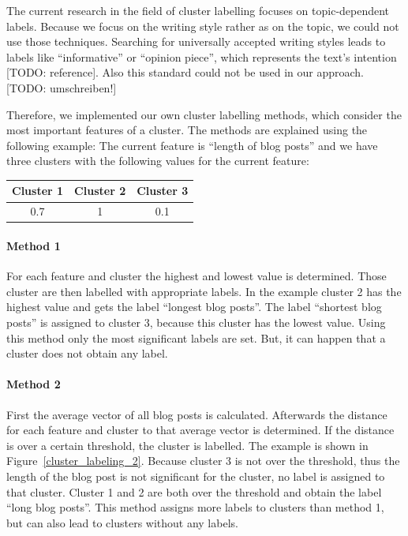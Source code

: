 The current research in the field of cluster labelling focuses on topic-dependent labels.
Because we focus on the writing style rather as on the topic, we could not use those techniques.
Searching for universally accepted writing styles leads to labels like ``informative'' or ``opinion piece'', which represents the text's intention [TODO: reference].
Also this standard could not be used in our approach.
[TODO: umschreiben!]

Therefore, we implemented our own cluster labelling methods, which consider the most important features of a cluster.
The methods are explained using the following example:
The current feature is ``length of blog posts'' and we have three clusters with the following values for the current feature:
\begin{center}
\begin{tabular}{c|c|c}
  Cluster 1 & Cluster 2 & Cluster 3 \\ \hline
  0.7 & 1 & 0.1 \\
 \end{tabular}
\end{center}
\paragraph{Method 1}
For each feature and cluster the highest and lowest value is determined.
Those cluster are then labelled with appropriate labels.
In the example cluster 2 has the highest value and gets the label ``longest blog posts''.
The label ``shortest blog posts'' is assigned to cluster 3, because this cluster has the lowest value.
Using this method only the most significant labels are set.
But, it can happen that a cluster does not obtain any label.

\paragraph{Method 2}
First the average vector of all blog posts is calculated.
Afterwards the distance for each feature and cluster to that average vector is determined.
If the distance is over a certain threshold, the cluster is labelled.
The example is shown in Figure~\ref{cluster_labeling_2}.
Because cluster 3 is not over the threshold, thus the length of the blog post is not significant for the cluster, no label is assigned to that cluster.
Cluster 1 and 2 are both over the threshold and obtain the label ``long blog posts''.
This method assigns more labels to clusters than method 1, but can also lead to clusters without any labels.

